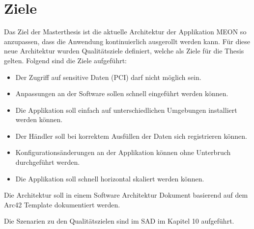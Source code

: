 \chapter{Ziele}

Das Ziel der Masterthesis ist die aktuelle Architektur der Applikation MEON so anzupassen, dass die Anwendung kontinuierlich ausgerollt werden kann. Für diese neue Architektur wurden Qualitätsziele definiert, welche als Ziele für die Thesis gelten. Folgend sind die Ziele aufgeführt:

\begin{itemize}
	\item Der Zugriff auf sensitive Daten (PCI) darf nicht möglich sein.
	\item Anpassungen an der Software sollen schnell eingeführt werden können.
	\item Die Applikation soll einfach auf unterschiedlichen Umgebungen installiert werden können.
	\item Der Händler soll bei korrektem Ausfüllen der Daten sich registrieren können.
	\item Konfigurationsänderungen an der Applikation können ohne Unterbruch durchgeführt werden.
	\item Die Applikation soll schnell horizontal skaliert werden können.
\end{itemize}

Die Architektur soll in einem Software Architektur Dokument basierend auf dem Arc42 Template dokumentiert werden.

Die Szenarien zu den Qualitätszielen sind im SAD im Kapitel 10 aufgeführt.
